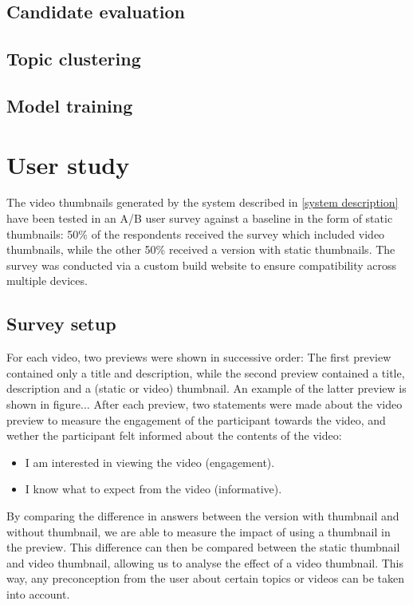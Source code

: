 \documentclass{../resources/acm_proc_article-sp}
\begin{document}
\subsection{Candidate evaluation}



\subsection{Topic clustering}

\subsection{Model training}

\section{User study}

The video thumbnails generated by the system described in \ref{system description} have been tested in an A/B user survey against a baseline in the form of static thumbnails: 50\% of the respondents received the survey which included video thumbnails, while the other 50\% received a version with static thumbnails. The survey was conducted via a custom build website to ensure compatibility across multiple devices.

\subsection{Survey setup}

For each video, two previews were shown in successive order: The first preview contained only a title and description, while the second preview contained a title, description and a (static or video) thumbnail. An example of the latter preview is shown in figure... %
After each preview, two statements were made about the video preview to measure the engagement of the participant towards the video, and wether the participant felt informed about the contents of the video:

\begin{itemize}
	\item I am interested in viewing the video (engagement).
	\item I know what to expect from the video (informative).
\end{itemize}

By comparing the difference in answers between the version with thumbnail and without thumbnail, we are able to measure the impact of using a thumbnail in the preview. This difference can then be compared between the static thumbnail and video thumbnail, allowing us to analyse the effect of a video thumbnail. This way, any preconception from the user about certain topics or videos can be taken into account.
\end{document}
